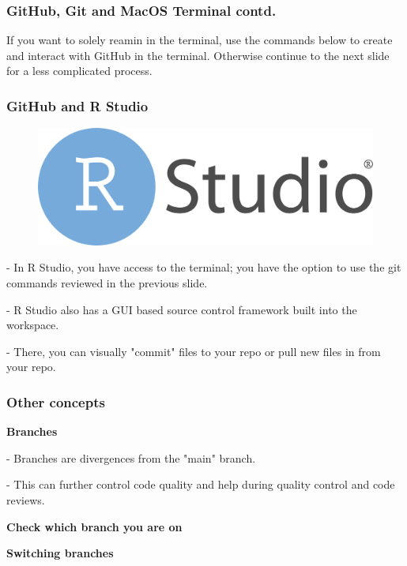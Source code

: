 \documentclass{beamer}
\begin{document}
\begin{frame}
\frametitle{GitHub, Git and MacOS Terminal contd.}

If you want to solely reamin in the terminal, use the commands below to create and interact with GitHub in the terminal. Otherwise continue to the next slide for a less complicated process.



\end{frame}

\begin{frame}
\frametitle{GitHub and R Studio}

\begin{figure}[t]
\includegraphics[scale=0.05]{images/RStudio-Logo-Flat.png}
\end{figure}

- In R Studio, you have access to the terminal; you have the option to use the git commands reviewed in the previous slide. 

- R Studio also has a GUI based source control framework built into the workspace. 

\hspace{10mm} - There, you can visually "commit" files to your repo or pull new files in from your repo.

\end{frame}

\begin{frame}
\frametitle{Other concepts}

\textbf{Branches}

\hspace{10mm} - Branches are divergences from the "main" branch.

\hspace{10mm} - This can further control code quality and help during quality control and code reviews.

\textbf{Check which branch you are on}

\hspace{10mm} 

\textbf{Switching branches}

\hspace{10mm} 

\end{frame}
\end{document}
